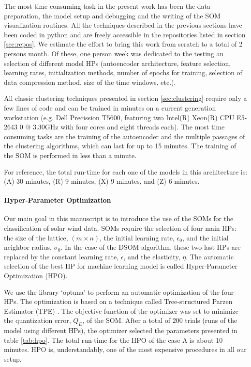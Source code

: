 The most time-consuming task in the present work has been the data preparation, the model setup and debugging and the writing of the SOM visualization routines. All the techniques described in the previous sections have been coded in python and are freely accessible in the repositories listed in section \ref{sec:repos}. We estimate the effort to bring this work from scratch to a total of 2 persons month. Of these, one person week was dedicated to the testing an selection of different model HPs (autoencoder architecture, feature selection, learning rates, initialization methods, number of epochs for training, selection of data compression method, size of the time windows, etc.).

All classic clustering techniques presented in section \ref{sec:clustering} require only a few lines of code and can be trained in minutes on a current generation workstation (e.g. Dell Precission T5600, featuring two Intel(R) Xeon(R) CPU E5-2643 0 @ 3.30GHz with four cores and eight threads each). The most time consuming tasks are the training of the autoencoder and the multiple passages of the clustering algorithms, which can last for up to 15 minutes. The training of the SOM is performed in less than a minute.

For reference, the total run-time for each one of the models in this architecture is: (A) 30 minutes, (R) 9 minutes, (X) 9 minutes, and (Z) 6 minutes.

\paragraph{Hyper-Parameter Optimization}
Our main goal in this manuscript is to introduce the use of the SOMs for the classification of solar wind data. SOMs require the selection of four main HPs: the size of the lattice, $(m\times n)$, the initial learning rate, $\epsilon_0$, and the initial neighbor radius, $\sigma_0$. In the case of the DSOM algorithm, these two last HPs are replaced by the constant learning rate, $\epsilon$, and the elasticity, $\eta$. The automatic selection of the best HP for machine learning model is called Hyper-Parameter Optimization (HPO).

We use the library `optuna' \citep{Akiba2019} to perform an automatic optimization of the four HPs. The optimization is based on a technique called Tree-structured Parzen Estimator (TPE) \citep{pmlr-v28-bergstra13}. The objective function of the optimizer was set to minimize the quantization error, $Q_E$, of the SOM. After a total of 200 trials (runs of the model using different HPs), the optimizer selected the parameters presented in table \ref{tab:hpo}. The total run-time for the HPO of the case A is about 10 minutes. HPO is, understandably, one of the most expensive procedures in all our setup.